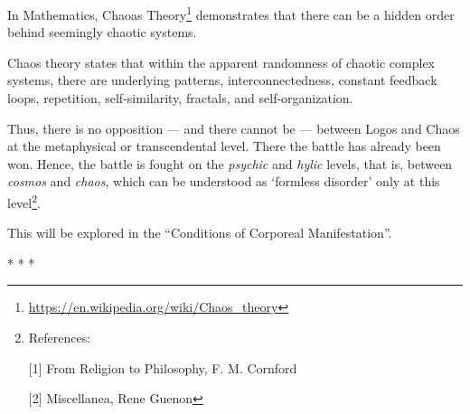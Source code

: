 In Mathematics, Chaoas Theory\footnote{\url{https://en.wikipedia.org/wiki/Chaos_theory}} demonstrates that there can be a hidden order behind seemingly chaotic systems.

\begin{quotex}
Chaos theory states that within the apparent randomness of chaotic complex systems, there are underlying patterns, interconnectedness, constant feedback loops, repetition, self-similarity, fractals, and self-organization. 

\end{quotex}
Thus, there is no opposition — and there cannot be — between Logos and Chaos at the metaphysical or transcendental level. There the battle has already been won. Hence, the battle is fought on the \emph{psychic} and \emph{hylic} levels, that is, between \emph{cosmos} and \emph{chaos}, which can be understood as `formless disorder' only at this level\footnote{References:

[1] From Religion to Philosophy, F. M. Cornford

[2] Miscellanea, Rene Guenon}.

This will be explored in the “Conditions of Corporeal Manifestation”.



\begin{center}* * *\end{center}

